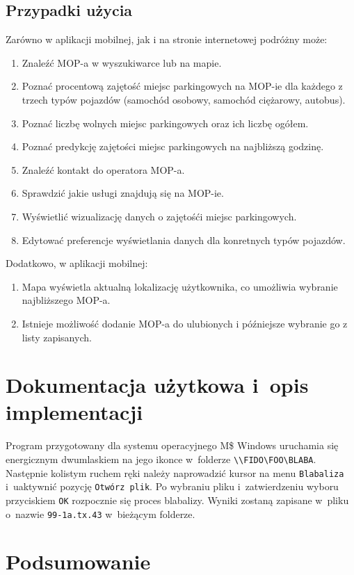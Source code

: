 \section{Przypadki użycia}
Zarówno w aplikacji mobilnej, jak i na stronie internetowej podróżny może:
\begin{enumerate}
\item Znaleźć MOP-a w wyszukiwarce lub na mapie.
\item Poznać procentową zajętość miejsc parkingowych na MOP-ie dla każdego z trzech typów pojazdów (samochód osobowy, samochód ciężarowy, autobus).
\item Poznać liczbę wolnych miejsc parkingowych oraz ich liczbę ogółem.
\item Poznać predykcję zajętości miejsc parkingowych na najbliższą godzinę.
\item Znaleźć kontakt do operatora MOP-a.
\item Sprawdzić jakie usługi znajdują się na MOP-ie.
\item Wyświetlić wizualizację danych o zajętośći miejsc parkingowych.
\item Edytować preferencje wyświetlania danych dla konretnych typów pojazdów.
\end{enumerate}
Dodatkowo, w aplikacji mobilnej:
\begin{enumerate}
\item Mapa wyświetla aktualną lokalizację użytkownika, co umożliwia wybranie najbliższego MOP-a. 
\item Istnieje możliwość dodanie MOP-a do ulubionych i późniejsze wybranie go z listy zapisanych.
\end{enumerate}

\chapter{Dokumentacja użytkowa i~opis implementacji}\label{r:impl}

Program przygotowany dla systemu operacyjnego M\$ Windows uruchamia
się energicznym dwumlaskiem na jego ikonce w~folderze
\verb+\\FIDO\FOO\BLABA+.  Następnie kolistym ruchem ręki należy
naprowadzić kursor na menu \texttt{Blabaliza} i~uaktywnić pozycję
\texttt{Otwórz plik}.  Po wybraniu pliku i~zatwierdzeniu wyboru
przyciskiem \texttt{OK} rozpocznie się proces blabalizy.  Wyniki
zostaną zapisane w~pliku o~nazwie \texttt{99-1a.tx.43} w~bieżącym
folderze.


\chapter{Podsumowanie}

